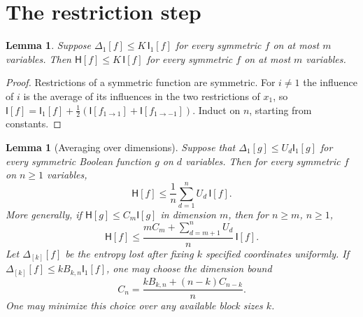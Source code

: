 \documentclass[11pt]{amsart}
\newtheorem{lemma}[theorem]{Lemma}
\theoremstyle{definition}
\theoremstyle{remark}
\newcommand{\HH}{\mathsf H}
\newcommand{\I}{\mathsf I}
\begin{document}
\section{The restriction step}\label{sec:restriction}

\begin{lemma}\label{lem:induction}
Suppose $\Delta_1[f]\le K\,\I_1[f]$ for every symmetric $f$ on at most $m$ variables. Then $\HH[f]\le K\,\I[f]$ for every symmetric $f$ on at most $m$ variables.
\end{lemma}

\begin{proof}
Restrictions of a symmetric function are symmetric. For $i\ne1$ the influence of $i$ is the average of its influences in the two restrictions of $x_1$, so $\I[f]=\I_1[f]+\frac12(\I[f_{1\to1}]+\I[f_{1\to-1}])$. Induct on $n$, starting from constants.
\end{proof}

\begin{lemma}[Averaging over dimensions]\label{lem:averaging}
Suppose that $\Delta_1[g]\le U_d\I_1[g]$ for every symmetric Boolean function $g$ on $d$ variables. Then for every symmetric $f$ on $n\ge1$ variables,
\[
 \HH[f]\le\frac1n\sum_{d=1}^n U_d\,\I[f].
\]
More generally, if $\HH[g]\le C_m\I[g]$ in dimension $m$, then for $n\ge m$, $n\ge1$,
\begin{equation}\label{eq:seeded}
 \HH[f]\le\frac{mC_m+\sum_{d=m+1}^n U_d}{n}\,\I[f].
\end{equation}
Let $\Delta_{[k]}[f]$ be the entropy lost after fixing $k$ specified coordinates uniformly. If $\Delta_{[k]}[f]\le kB_{k,n}\I_1[f]$, one may choose the dimension bound
\begin{equation}\label{eq:blockrecurrence}
 C_n=\frac{kB_{k,n}+(n-k)C_{n-k}}{n}.
\end{equation}
One may minimize this choice over any available block sizes $k$.
\end{lemma}
\end{document}
